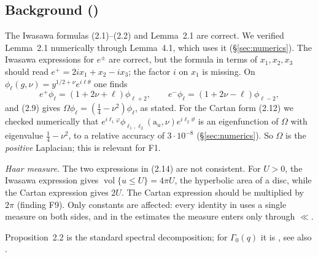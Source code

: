 \documentclass[11pt]{amsart}
\theoremstyle{remark}
\theoremstyle{definition}
\numberwithin{equation}{section}
\newcommand{\vol}{\operatorname{vol}}
\newcommand{\ra}{\mathrm{a}}
\begin{document}
\subsection{Background (\texorpdfstring{\cite[\S2]{GM1}}{[GM1, §2]})}
The Iwasawa formulas (2.1)--(2.2) and Lemma~2.1 are correct. We verified Lemma~2.1 numerically through Lemma~4.1, which uses it (\S\ref{sec:numerics}). The Iwasawa expressions for $e^\pm$ are correct, but the formula in terms of $x_1,x_2,x_3$ should read $e^+=2ix_1+x_2-ix_3$; the factor $i$ on $x_1$ is missing. On $\phi_\ell(g,\nu)=y^{1/2+\nu}e^{i\ell\theta}$ one finds
\begin{equation}\label{eq:raise}
e^+\phi_\ell=(1+2\nu+\ell)\phi_{\ell+2},\qquad e^-\phi_\ell=(1+2\nu-\ell)\phi_{\ell-2},
\end{equation}
and (2.9) gives $\Omega\phi_\ell=(\frac14-\nu^2)\phi_\ell$, as stated. For the Cartan form (2.12) we checked numerically that $e^{i\ell_1\varphi}\phi_{\ell_1,\ell_2}(\ra_u,\nu)e^{i\ell_2\vartheta}$ is an eigenfunction of $\Omega$ with eigenvalue $\frac14-\nu^2$, to a relative accuracy of $3\cdot10^{-8}$ (\S\ref{sec:numerics}). So $\Omega$ is the \emph{positive} Laplacian; this is relevant for F1.

\emph{Haar measure.} The two expressions in (2.14) are not consistent. For $U>0$, the Iwasawa expression gives $\vol\{u\le U\}=4\pi U$, the hyperbolic area of a disc, while the Cartan expression gives $2U$. The Cartan expression should be multiplied by $2\pi$ (finding F9). Only constants are affected: every identity in \cite{GM1} uses a single measure on both sides, and in the estimates the measure enters only through $\ll$.

Proposition~2.2 is the standard spectral decomposition; for $\Gamma_0(q)$ it is \cite[\S4]{DFI02}, see also \cite[Chapters~4, 7]{Iw}.
\end{document}

